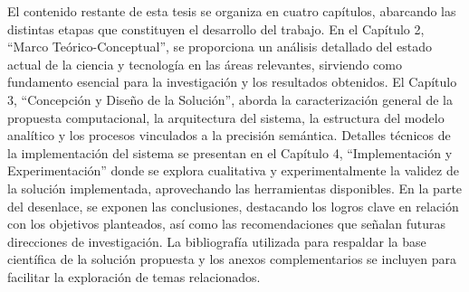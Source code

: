 El contenido restante de esta tesis se organiza en cuatro capítulos, abarcando las distintas etapas que constituyen el desarrollo del trabajo. En el Capítulo 2, ``Marco Teórico-Conceptual'', se proporciona un análisis detallado del estado actual de la ciencia y tecnología en las áreas relevantes, sirviendo como fundamento esencial para la investigación y los resultados obtenidos. El Capítulo 3, ``Concepción y Diseño de la Solución'', aborda la caracterización general de la propuesta computacional, la arquitectura del sistema, la estructura del modelo analítico y los procesos vinculados a la precisi\'on sem\'antica. Detalles técnicos de la implementación del sistema se presentan en el Capítulo 4, ``Implementación y Experimentación'' donde se explora cualitativa y experimentalmente la validez de la solución implementada, aprovechando las herramientas disponibles. En la parte del desenlace, se exponen las conclusiones, destacando los logros clave en relación con los objetivos planteados, así como las recomendaciones que señalan futuras direcciones de investigación. La bibliografía utilizada para respaldar la base científica de la solución propuesta y los anexos complementarios se incluyen para facilitar la exploración de temas relacionados.